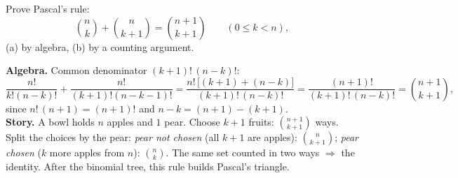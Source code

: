 
\begin{problem}
	Prove Pascal's rule:
	\[ \binom nk+\binom n{k+1}=\binom{n+1}{k+1} \qquad (0\le k<n), \]
	(a) by algebra, (b) by a counting argument.
\end{problem}

\begin{slides}
	\small
	\exstatement
	\pause
	\sol \textbf{Algebra.} Common denominator $(k+1)!\,(n-k)!$:
	\[
		\frac{n!}{k!(n-k)!}+\frac{n!}{(k+1)!(n-k-1)!}
		= \frac{n!\,\big[(k+1)+(n-k)\big]}{(k+1)!\,(n-k)!}
		= \frac{(n+1)!}{(k+1)!\,(n-k)!} = \binom{n+1}{k+1},
	\]
	since $n!\,(n+1)=(n+1)!$ and $n-k=(n+1)-(k+1)$.\\[1mm]
	\textbf{Story.} A bowl holds $n$ apples and $1$ pear. Choose $k+1$ fruits:
	$\binom{n+1}{k+1}$ ways. Split the choices by the pear:
	\emph{pear not chosen} (all $k+1$ are apples): $\binom n{k+1}$;
	\emph{pear chosen} ($k$ more apples from $n$): $\binom nk$.
	The same set counted in two ways $\Rightarrow$ the identity. After the
	binomial tree, this rule builds Pascal's triangle.
\end{slides}

